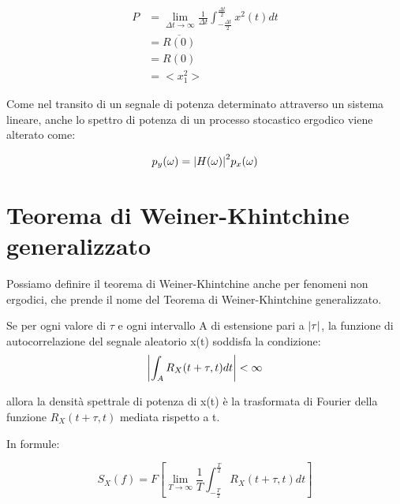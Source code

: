 {
    \Large 
    \begin{equation}
        \begin{split}
            P 
            &= 
            \lim_{\Delta t \to \infty}
            \frac{1}{\Delta t}
            \int_{-\frac{\Delta t}{2}}^{\frac{\Delta t}{2}}
            x^{2} (t) dt 
            \\ 
            &= 
            \overline{R (0)}
            \\ 
            &= 
            R(0)
            \\ 
            &= 
            <x_1 ^{2}>
        \end{split}
    \end{equation}
}

Come nel transito di un segnale di potenza determinato attraverso un sistema lineare, 
anche lo spettro di potenza di un processo stocastico ergodico viene alterato come: 

{
    \Large 
    \begin{equation}
        p_y (\omega) = \abs{H (\omega)}^{2} p_x (\omega)
    \end{equation}
}

\newpage 

\section{Teorema di Weiner-Khintchine generalizzato}

Possiamo definire il teorema di Weiner-Khintchine anche per fenomeni non ergodici, che prende il nome del Teorema di Weiner-Khintchine generalizzato. \newline 


Se per ogni valore di $\tau$ e ogni intervallo A di estensione pari a $\abs{\tau}$, la funzione di autocorrelazione del segnale aleatorio x(t) soddisfa la condizione:
{
    \Large 
    \begin{equation}
        \abs{\int_{A} R_X (t+ \tau, t) dt} < \infty
    \end{equation}
}

allora la densità spettrale di potenza di x(t) è la trasformata di Fourier della funzione 
$R_X (t+ \tau, t)$ mediata rispetto a t. \newline 

In formule: 

{
    \Large 
    \begin{equation}
        S_X (f) = F[\lim_{T \to \infty} \frac{1}{T} \int_{- \frac{T}{2}}^{\frac{T}{2}} R_X (t+ \tau, t) dt ]
    \end{equation}
}

